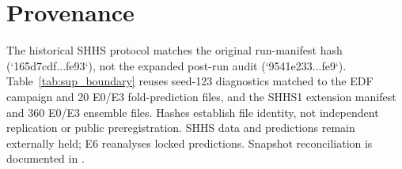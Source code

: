 \documentclass[10pt,a4paper]{article}
\begin{document}
\section*{Provenance}

The historical SHHS protocol matches the original run-manifest hash (`165d7cdf...fe93`), not the
expanded post-run audit (`9541e233...fe9`). Table~\ref{tab:sup_boundary} reuses seed-123 diagnostics
matched to the EDF campaign and 20 E0/E3 fold-prediction files, and the SHHS1 extension manifest and
360 E0/E3 ensemble files. Hashes establish file identity, not independent replication or public
preregistration. SHHS data and predictions remain externally held; E6 reanalyses locked predictions.
Snapshot reconciliation is documented in .
\end{document}

